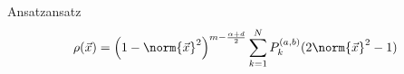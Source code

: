 \begin{definition}{Ansatz}{ansatz}
  \[\rho(\vec{x}) = \left(1-\norm{\vec{x}}^{2}\right)^{m - \frac{\alpha + d}{2}} \sum_{k=1}^{N} P_{k}^{(a,b)}(2 \norm{\vec{x}}^{2}-1)\]

\end{definition}
